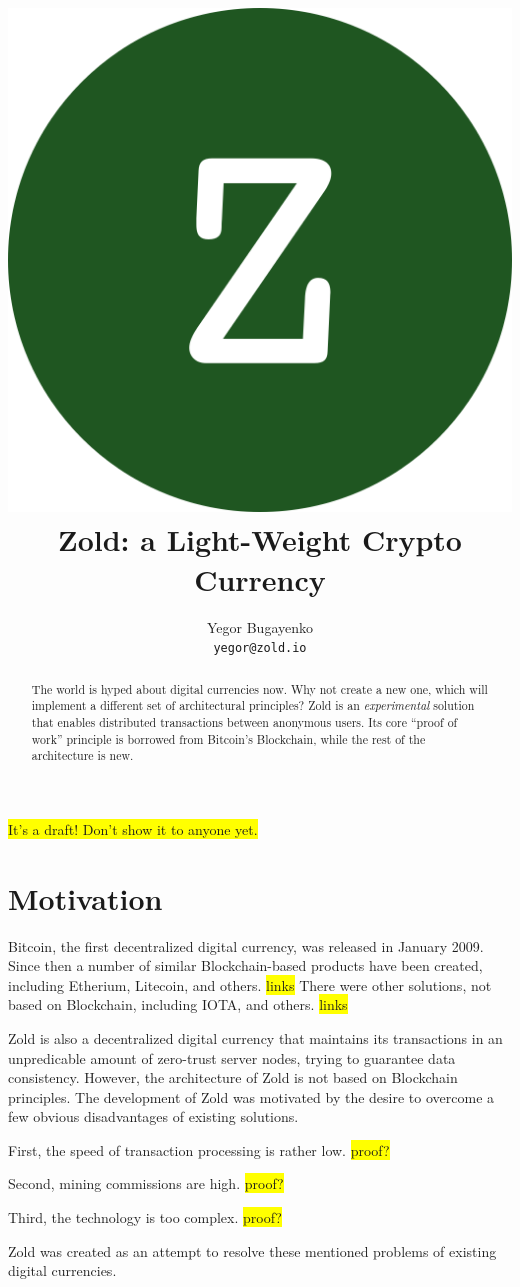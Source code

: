 \documentclass[11pt,oneside]{article}
\title{\includegraphics[scale=0.05]{logo.png}\\Zold: a Light-Weight Crypto Currency}
\author{Yegor Bugayenko\\\texttt{yegor@zold.io}}
\begin{document}
\raggedbottom

\maketitle
\begin{abstract}
The world is hyped about digital currencies now. Why not create a new one,
which will implement a different set of architectural principles? Zold is
an \emph{experimental} solution that enables distributed transactions between
anonymous users. Its core ``proof of work'' principle is borrowed from Bitcoin's Blockchain,
while the rest of the architecture is new.
\end{abstract}

\colorbox{yellow}{It's a draft! Don't show it to anyone yet.}

\section{Motivation}

Bitcoin, the first decentralized digital currency, was released in
January 2009. Since then a number of similar Blockchain-based products have been
created, including Etherium, Litecoin, and others. \colorbox{yellow}{links} There were other solutions,
not based on Blockchain, including IOTA, and others. \colorbox{yellow}{links}

Zold is also a decentralized digital currency that maintains its transactions
in an unpredicable amount of zero-trust server nodes, trying to guarantee
data consistency. However, the architecture of Zold is not based on Blockchain
principles. The development of Zold was motivated by the desire to overcome
a few obvious disadvantages of existing solutions.

First, the speed of transaction processing is rather low. \colorbox{yellow}{proof?}

Second, mining commissions are high. \colorbox{yellow}{proof?}

Third, the technology is too complex. \colorbox{yellow}{proof?}

Zold was created as an attempt to resolve these mentioned problems
of existing digital currencies.

\end{document}
